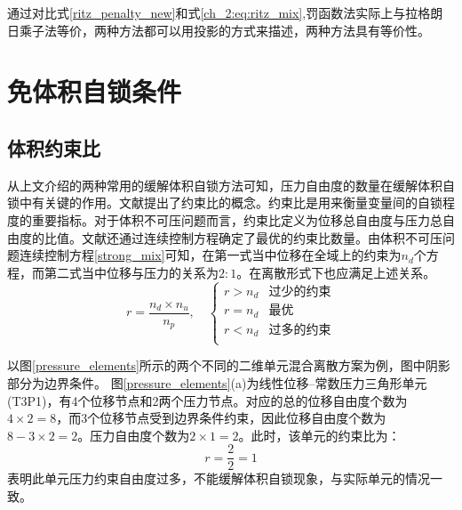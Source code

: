 通过对比式\eqref{ritz_penalty_new}和式\eqref{ch_2:eq:ritz_mix},罚函数法实际上与拉格朗日乘子法等价，两种方法都可以用投影的方式来描述，两种方法具有等价性。

\section{免体积自锁条件}
\subsection{体积约束比}
从上文介绍的两种常用的缓解体积自锁方法可知，压力自由度的数量在缓解体积自锁中有关键的作用。文献{\cite{hughes2000}}提出了约束比的概念。约束比是用来衡量变量间的自锁程度的重要指标。对于体积不可压问题而言，约束比定义为位移总自由度与压力总自由度的比值。文献{\cite{hughes2000}}还通过连续控制方程确定了最优的约束比数量。由体积不可压问题连续控制方程\eqref{strong_mix}可知，在第一式当中位移在全域上的约束为$n_d$个方程，而第二式当中位移与压力的关系为$2:1$。在离散形式下也应满足上述关系。
\begin{equation}
    r = \frac{n_d\times n_u}{n_p}, \quad 
    \begin{cases}
        r > n_d & \text{过少的约束} \\
        r = n_d & \text{最优} \\
        r < n_d & \text{过多的约束} \\
    \end{cases}
\end{equation}

以图\ref{pressure_elements}所示的两个不同的二维单元混合离散方案为例，图中阴影部分为边界条件。
图\ref{pressure_elements}(a)为线性位移--常数压力三角形单元(T3P1)，有4个位移节点和2两个压力节点。对应的总的位移自由度个数为$4\times2=8$，而3个位移节点受到边界条件约束，因此位移自由度个数为$8-3\times2=2$。压力自由度个数为$2\times1=2$。此时，该单元的约束比为：
\begin{equation}
    r=\frac{2}{2}=1
\end{equation}
表明此单元压力约束自由度过多，不能缓解体积自锁现象，与实际单元的情况一致。

